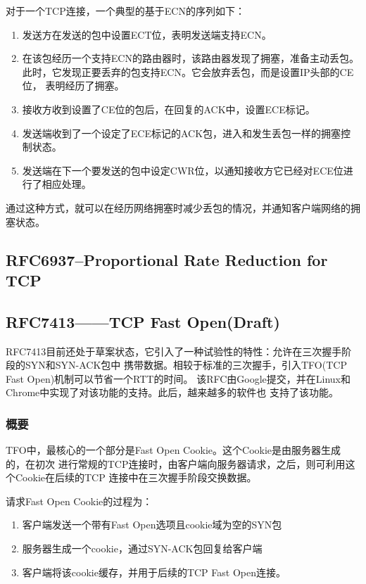 对于一个TCP连接，一个典型的基于ECN的序列如下：
\begin{enumerate}
  \item 发送方在发送的包中设置ECT位，表明发送端支持ECN。
  \item 在该包经历一个支持ECN的路由器时，该路由器发现了拥塞，准备主动丢包。
    此时，它发现正要丢弃的包支持ECN。它会放弃丢包，而是设置IP头部的CE位，
    表明经历了拥塞。
  \item 接收方收到设置了CE位的包后，在回复的ACK中，设置ECE标记。
  \item 发送端收到了一个设定了ECE标记的ACK包，进入和发生丢包一样的拥塞控制状态。
  \item 发送端在下一个要发送的包中设定CWR位，以通知接收方它已经对ECE位进行了相应处理。
\end{enumerate}

通过这种方式，就可以在经历网络拥塞时减少丢包的情况，并通知客户端网络的拥塞状态。

\subsection{RFC6937--Proportional Rate Reduction for TCP}
\label{subsec:rfc6937}

	
\subsection{RFC7413——TCP Fast Open(Draft)}
\label{subsec:rfc7413}

RFC7413目前还处于草案状态，它引入了一种试验性的特性：允许在三次握手阶段的SYN和SYN-ACK包中
携带数据。相较于标准的三次握手，引入TFO(TCP Fast Open)机制可以节省一个RTT的时间。
该RFC由Google提交，并在Linux和Chrome中实现了对该功能的支持。此后，越来越多的软件也
支持了该功能。

\subsubsection{概要}
\label{subsubsec:rfc7413-overview}
TFO中，最核心的一个部分是Fast Open Cookie。这个Cookie是由服务器生成的，在初次
进行常规的TCP连接时，由客户端向服务器请求，之后，则可利用这个Cookie在后续的TCP
连接中在三次握手阶段交换数据。

请求Fast Open Cookie的过程为：
\begin{enumerate}
  \item 客户端发送一个带有Fast Open选项且cookie域为空的SYN包
  \item 服务器生成一个cookie，通过SYN-ACK包回复给客户端
  \item 客户端将该cookie缓存，并用于后续的TCP Fast Open连接。
\end{enumerate}


